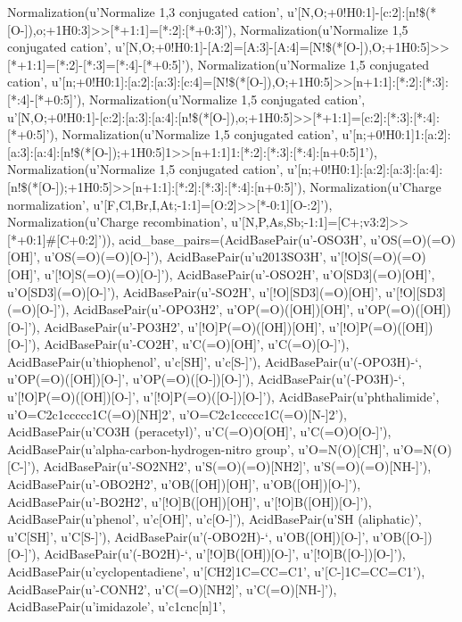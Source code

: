 \documentclass[letterpaper,10pt,english]{sphinxmanual}
\begin{document}
\begin{fulllineitems}
Normalization(u'Normalize 1,3 conjugated cation', u'{[}N,O;+0!H0:1{]}-{[}c:2{]}:{[}n!\$(*{[}O-{]}),o;+1H0:3{]}\textgreater{}\textgreater{}{[}*+1:1{]}={[}*:2{]}:{[}*+0:3{]}'), Normalization(u'Normalize 1,5 conjugated cation', u'{[}N,O;+0!H0:1{]}-{[}A:2{]}={[}A:3{]}-{[}A:4{]}={[}N!\$(*{[}O-{]}),O;+1H0:5{]}\textgreater{}\textgreater{}{[}*+1:1{]}={[}*:2{]}-{[}*:3{]}={[}*:4{]}-{[}*+0:5{]}'), Normalization(u'Normalize 1,5 conjugated cation', u'{[}n;+0!H0:1{]}:{[}a:2{]}:{[}a:3{]}:{[}c:4{]}={[}N!\$(*{[}O-{]}),O;+1H0:5{]}\textgreater{}\textgreater{}{[}n+1:1{]}:{[}*:2{]}:{[}*:3{]}:{[}*:4{]}-{[}*+0:5{]}'), Normalization(u'Normalize 1,5 conjugated cation', u'{[}N,O;+0!H0:1{]}-{[}c:2{]}:{[}a:3{]}:{[}a:4{]}:{[}n!\$(*{[}O-{]}),o;+1H0:5{]}\textgreater{}\textgreater{}{[}*+1:1{]}={[}c:2{]}:{[}*:3{]}:{[}*:4{]}:{[}*+0:5{]}'), Normalization(u'Normalize 1,5 conjugated cation', u'{[}n;+0!H0:1{]}1:{[}a:2{]}:{[}a:3{]}:{[}a:4{]}:{[}n!\$(*{[}O-{]});+1H0:5{]}1\textgreater{}\textgreater{}{[}n+1:1{]}1:{[}*:2{]}:{[}*:3{]}:{[}*:4{]}:{[}n+0:5{]}1'), Normalization(u'Normalize 1,5 conjugated cation', u'{[}n;+0!H0:1{]}:{[}a:2{]}:{[}a:3{]}:{[}a:4{]}:{[}n!\$(*{[}O-{]});+1H0:5{]}\textgreater{}\textgreater{}{[}n+1:1{]}:{[}*:2{]}:{[}*:3{]}:{[}*:4{]}:{[}n+0:5{]}'), Normalization(u'Charge normalization', u'{[}F,Cl,Br,I,At;-1:1{]}={[}O:2{]}\textgreater{}\textgreater{}{[}*-0:1{]}{[}O-:2{]}'), Normalization(u'Charge recombination', u'{[}N,P,As,Sb;-1:1{]}={[}C+;v3:2{]}\textgreater{}\textgreater{}{[}*+0:1{]}\#{[}C+0:2{]}')), acid\_base\_pairs=(AcidBasePair(u'-OSO3H', u'OS(=O)(=O){[}OH{]}', u'OS(=O)(=O){[}O-{]}'), AcidBasePair(u'u2013SO3H', u'{[}!O{]}S(=O)(=O){[}OH{]}', u'{[}!O{]}S(=O)(=O){[}O-{]}'), AcidBasePair(u'-OSO2H', u'O{[}SD3{]}(=O){[}OH{]}', u'O{[}SD3{]}(=O){[}O-{]}'), AcidBasePair(u'-SO2H', u'{[}!O{]}{[}SD3{]}(=O){[}OH{]}', u'{[}!O{]}{[}SD3{]}(=O){[}O-{]}'), AcidBasePair(u'-OPO3H2', u'OP(=O)({[}OH{]}){[}OH{]}', u'OP(=O)({[}OH{]}){[}O-{]}'), AcidBasePair(u'-PO3H2', u'{[}!O{]}P(=O)({[}OH{]}){[}OH{]}', u'{[}!O{]}P(=O)({[}OH{]}){[}O-{]}'), AcidBasePair(u'-CO2H', u'C(=O){[}OH{]}', u'C(=O){[}O-{]}'), AcidBasePair(u'thiophenol', u'c{[}SH{]}', u'c{[}S-{]}'), AcidBasePair(u'(-OPO3H)-`, u'OP(=O)({[}OH{]}){[}O-{]}', u'OP(=O)({[}O-{]}){[}O-{]}'), AcidBasePair(u'(-PO3H)-`, u'{[}!O{]}P(=O)({[}OH{]}){[}O-{]}', u'{[}!O{]}P(=O)({[}O-{]}){[}O-{]}'), AcidBasePair(u'phthalimide', u'O=C2c1ccccc1C(=O){[}NH{]}2', u'O=C2c1ccccc1C(=O){[}N-{]}2'), AcidBasePair(u'CO3H (peracetyl)', u'C(=O)O{[}OH{]}', u'C(=O)O{[}O-{]}'), AcidBasePair(u'alpha-carbon-hydrogen-nitro group', u'O=N(O){[}CH{]}', u'O=N(O){[}C-{]}'), AcidBasePair(u'-SO2NH2', u'S(=O)(=O){[}NH2{]}', u'S(=O)(=O){[}NH-{]}'), AcidBasePair(u'-OBO2H2', u'OB({[}OH{]}){[}OH{]}', u'OB({[}OH{]}){[}O-{]}'), AcidBasePair(u'-BO2H2', u'{[}!O{]}B({[}OH{]}){[}OH{]}', u'{[}!O{]}B({[}OH{]}){[}O-{]}'), AcidBasePair(u'phenol', u'c{[}OH{]}', u'c{[}O-{]}'), AcidBasePair(u'SH (aliphatic)', u'C{[}SH{]}', u'C{[}S-{]}'), AcidBasePair(u'(-OBO2H)-`, u'OB({[}OH{]}){[}O-{]}', u'OB({[}O-{]}){[}O-{]}'), AcidBasePair(u'(-BO2H)-`, u'{[}!O{]}B({[}OH{]}){[}O-{]}', u'{[}!O{]}B({[}O-{]}){[}O-{]}'), AcidBasePair(u'cyclopentadiene', u'{[}CH2{]}1C=CC=C1', u'{[}C-{]}1C=CC=C1'), AcidBasePair(u'-CONH2', u'C(=O){[}NH2{]}', u'C(=O){[}NH-{]}'), AcidBasePair(u'imidazole', u'c1cnc{[}n{]}1', 
\end{fulllineitems}
\end{document}
